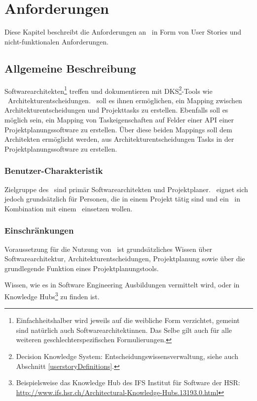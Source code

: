\chapter{Anforderungen}

Diese Kapitel beschreibt die Anforderungen an \eeppi\ in Form von User Stories und nicht-funktionalen Anforderungen.

\section{Allgemeine Beschreibung}

Softwarearchitekten\footnote{Einfachheitshalber wird jeweils auf die weibliche Form verzichtet, gemeint sind natürlich auch Softwarearchitektinnen. Das Selbe gilt auch für alle weiteren geschlechterspezifischen Formulierungen.} treffen und dokumentieren mit DKS\footnote{Decision Knowledge System: Entscheidungswissensverwaltung, siehe auch Abschnitt \ref{userstoryDefinitions}.}-Tools wie \cdar\ Architekturentscheidungen.
\eeppi\ soll es ihnen ermöglichen, ein Mapping zwischen Architekturentscheidungen und Projekttasks zu erstellen.
Ebenfalls soll es möglich sein, ein Mapping von Taskeigenschaften auf Felder einer API einer Projektplanungssoftware zu erstellen.
Über diese beiden Mappings soll dem Architekten ermöglicht werden, aus Architekturentscheidungen Tasks in der Projektplanungssoftware zu erstellen.

\subsection{Benutzer-Charakteristik}
Zielgruppe des \eeppi\ sind primär Softwarearchitekten und Projektplaner. \eeppi\ eignet sich jedoch grundsätzlich für Personen, die in einem Projekt tätig sind und ein \dks\ in Kombination mit einem \ppt\ einsetzen wollen.

\subsection{Einschränkungen}
Voraussetzung für die Nutzung von \eeppi\ ist grundsätzliches Wissen über Softwarearchitektur, Architekturentscheidungen, Projektplanung sowie über die grundlegende Funktion eines Projektplanungstools.

Wissen, wie es in Software Engineering Ausbildungen vermittelt wird,
oder in Knowledge Hubs\footnote{Beispielsweise das Knowledge Hub des IFS Institut für Software der HSR: \url{http://www.ifs.hsr.ch/Architectural-Knowledge-Hubs.13193.0.html}} zu finden ist.